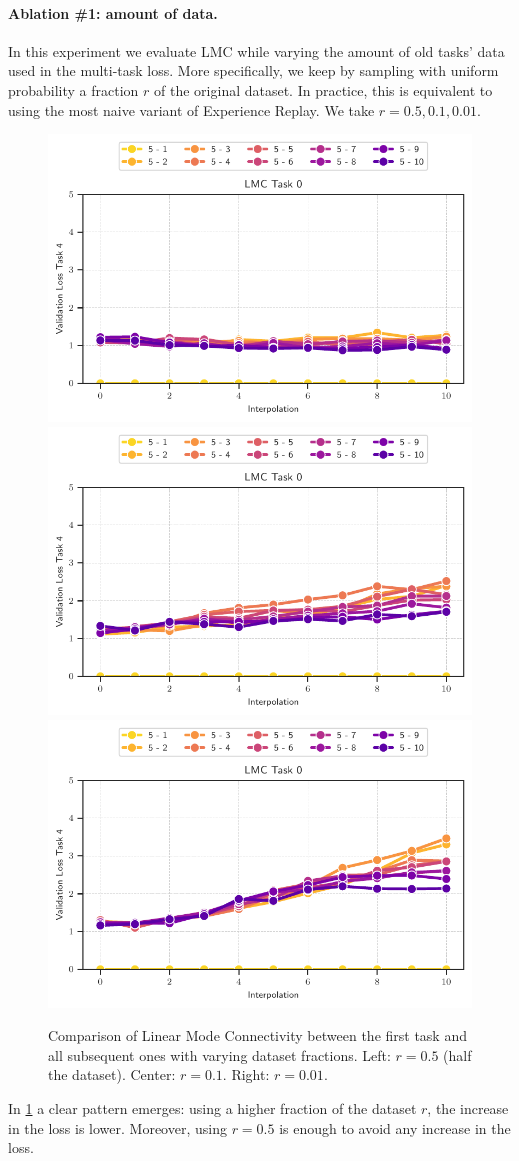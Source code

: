 \documentclass{article} %
\begin{document}
\paragraph{Ablation \#1: amount of data.} In this experiment we evaluate LMC while varying the amount of old tasks' data used in the multi-task loss. More specifically, we keep by sampling with uniform probability a fraction $r$ of the original dataset. In practice, this is equivalent to using the most naive variant of Experience Replay. We take $r=0.5, 0.1, 0.01$. 
\begin{figure}[h!]
    \centering
    \includegraphics[width=0.3\linewidth]{figures/LMC_task_0_re05.pdf}
    \includegraphics[width=0.3\linewidth]{figures/LMC_task_0_re01.pdf}
    \includegraphics[width=0.3\linewidth]{figures/LMC_task_0_re001.pdf}
    \caption{Comparison of Linear Mode Connectivity between the first task and all subsequent ones with varying dataset fractions. Left: $r=0.5$ (half the dataset). Center: $r=0.1$. Right: $r=0.01$. }
    \label{fig:LMC-Replay-Fraction}
\end{figure}
In \cref{fig:LMC-Replay-Fraction} a clear pattern emerges: using a higher 
fraction of the dataset $r$, the increase in the loss is lower. Moreover, using $r=0.5$ is enough to avoid any increase in the loss. 
\end{document}

